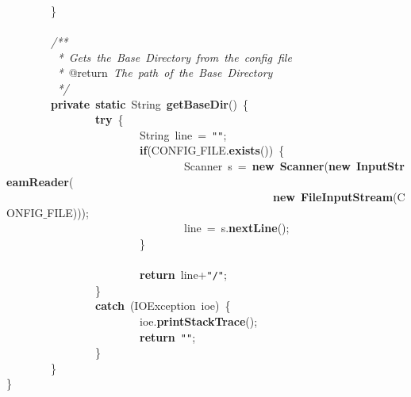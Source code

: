 \mbox{}\ \ \ \ \ \ \ \ \} \\
\mbox{} \\
\mbox{}\ \ \ \ \ \ \ \ \textit{/**} \\
\mbox{}\textit{\ \ \ \ \ \ \ \ \ *\ Gets\ the\ Base\ Directory\ from\ the\ config\ file} \\
\mbox{}\textit{\ \ \ \ \ \ \ \ \ *\ }@return\textit{\ The\ path\ of\ the\ Base\ Directory} \\
\mbox{}\textit{\ \ \ \ \ \ \ \ \ */} \\
\mbox{}\ \ \ \ \ \ \ \ \textbf{private}\ \textbf{static}\ String\ \textbf{getBaseDir}()\ \{ \\
\mbox{}\ \ \ \ \ \ \ \ \ \ \ \ \ \ \ \ \textbf{try}\ \{ \\
\mbox{}\ \ \ \ \ \ \ \ \ \ \ \ \ \ \ \ \ \ \ \ \ \ \ \ String\ line\ =\ \texttt{"{}"{}}; \\
\mbox{}\ \ \ \ \ \ \ \ \ \ \ \ \ \ \ \ \ \ \ \ \ \ \ \ \textbf{if}(CONFIG$\_$FILE.\textbf{exists}())\ \{ \\
\mbox{}\ \ \ \ \ \ \ \ \ \ \ \ \ \ \ \ \ \ \ \ \ \ \ \ \ \ \ \ \ \ \ \ Scanner\ s\ =\ \textbf{new}\ \textbf{Scanner}(\textbf{new}\ \textbf{InputStreamReader}( \\
\mbox{}\ \ \ \ \ \ \ \ \ \ \ \ \ \ \ \ \ \ \ \ \ \ \ \ \ \ \ \ \ \ \ \ \ \ \ \ \ \ \ \ \ \ \ \ \ \ \ \ \textbf{new}\ \textbf{FileInputStream}(CONFIG$\_$FILE))); \\
\mbox{}\ \ \ \ \ \ \ \ \ \ \ \ \ \ \ \ \ \ \ \ \ \ \ \ \ \ \ \ \ \ \ \ line\ =\ s.\textbf{nextLine}(); \\
\mbox{}\ \ \ \ \ \ \ \ \ \ \ \ \ \ \ \ \ \ \ \ \ \ \ \ \} \\
\mbox{}\ \ \ \ \ \ \ \  \\
\mbox{}\ \ \ \ \ \ \ \ \ \ \ \ \ \ \ \ \ \ \ \ \ \ \ \ \textbf{return}\ line+\texttt{"{}/"{}}; \\
\mbox{}\ \ \ \ \ \ \ \ \ \ \ \ \ \ \ \ \} \\
\mbox{}\ \ \ \ \ \ \ \ \ \ \ \ \ \ \ \ \textbf{catch}\ (IOException\ ioe)\ \{ \\
\mbox{}\ \ \ \ \ \ \ \ \ \ \ \ \ \ \ \ \ \ \ \ \ \ \ \ ioe.\textbf{printStackTrace}(); \\
\mbox{}\ \ \ \ \ \ \ \ \ \ \ \ \ \ \ \ \ \ \ \ \ \ \ \ \textbf{return}\ \texttt{"{}"{}}; \\
\mbox{}\ \ \ \ \ \ \ \ \ \ \ \ \ \ \ \ \} \\
\mbox{}\ \ \ \ \ \ \ \ \} \\
\mbox{}\} \\

